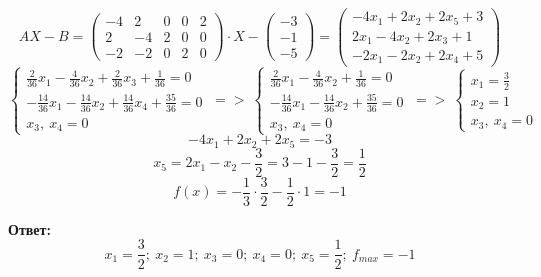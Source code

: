 \documentclass{article}
\begin{document}
\[
    AX -B =
    \begin{pmatrix}
        -4&2&0&0&2\\
        2&-4&2&0&0\\
        -2&-2&0&2&0
    \end{pmatrix}
    \cdot 
    X -
    \begin{pmatrix}
        -3\\
        -1\\
        -5
    \end{pmatrix} = 
    \begin{pmatrix}
        -4x_1+2x_2+2x_5+3\\
        2x_1-4x_2+2x_3+1\\
        -2x_1-2x_2+2x_4+5
    \end{pmatrix}
\]
\[\begin{cases}
    \frac{2}{36}x_1 - \frac{4}{36}x_2 +\frac{2}{36}x_3 + \frac{1}{36} = 0\\
    -\frac{14}{36}x_1-\frac{14}{36}x_2+\frac{14}{36}x_4 + \frac{35}{36} = 0\\
    x_3,\ x_4 = 0
\end{cases}\ => \ 
\begin{cases}
    \frac{2}{36}x_1 - \frac{4}{36}x_2 + \frac{1}{36} = 0\\
    -\frac{14}{36}x_1-\frac{14}{36}x_2 + \frac{35}{36} = 0\\
    x_3,\ x_4 = 0
\end{cases}\ =>\ 
\begin{cases}
    x_1 = \frac{3}{2}\\
    x_2 = 1\\
    x_3,\ x_4 = 0
\end{cases}
\]
\[-4x_1+2x_2+2x_5=-3\]
\[x_5 = 2x_1 - x_2 -\frac{3}{2} = 3 -1-\frac{3}{2} = \frac{1}{2}\]
\[f(x) = -\frac{1}{3}\cdot \frac{3}{2} - \frac{1}{2}\cdot 1 = -1\]

\textbf{Ответ:}
\[x_1 = \frac{3}{2};\ x_2 = 1;\ x_3 = 0;\ x_4 = 0;\ x_5 = \frac{1}{2};\ f_{max} = -1\]
\end{document}
